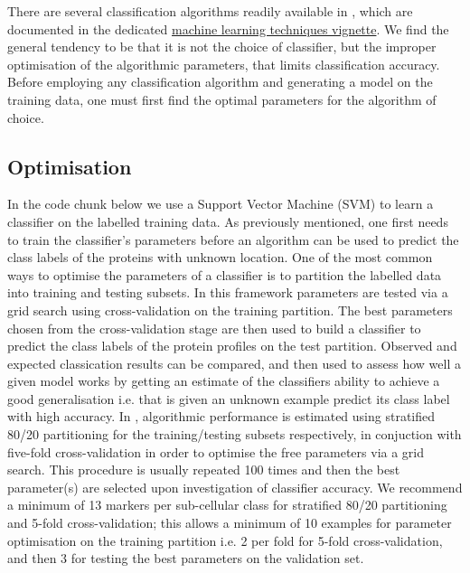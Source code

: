 There are several classification algorithms readily available in
, which are documented in the dedicated
\href{http://bioconductor.org/packages/release/bioc/vignettes/pRoloc/inst/doc/pRoloc-ml.pdf}{
  machine learning techniques vignette}.  We find the general tendency
to be that it is not the choice of classifier, but the improper
optimisation of the algorithmic parameters, that limits classification
accuracy. Before employing any classification algorithm and generating
a model on the training data, one must first find the optimal
parameters for the algorithm of choice.

\subsection*{Optimisation}

In the code chunk below we use a Support Vector Machine (SVM) to learn
a classifier on the labelled training data. As previously mentioned,
one first needs to train the classifier's parameters before an
algorithm can be used to predict the class labels of the proteins with
unknown location. One of the most common ways to optimise the
parameters of a classifier is to partition the labelled data into
training and testing subsets. In this framework parameters are tested
via a grid search using cross-validation on the training
partition. The best parameters chosen from the cross-validation stage
are then used to build a classifier to predict the class labels of the
protein profiles on the test partition. Observed and expected
classication results can be compared, and then used to assess how well
a given model works by getting an estimate of the classifiers ability
to achieve a good generalisation i.e. that is given an unknown example
predict its class label with high accuracy. In ,
algorithmic performance is estimated using stratified 80/20
partitioning for the training/testing subsets respectively, in
conjuction with five-fold cross-validation in order to optimise the
free parameters via a grid search. This procedure is usually repeated
100 times and then the best parameter(s) are selected upon
investigation of classifier accuracy. We recommend a minimum of 13
markers per sub-cellular class for stratified 80/20 partitioning and
5-fold cross-validation; this allows a minimum of 10 examples for
parameter optimisation on the training partition i.e. 2 per fold for
5-fold cross-validation, and then 3 for testing the best parameters on
the validation set.

